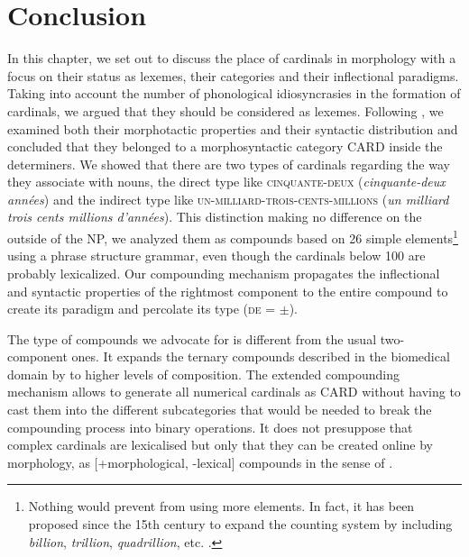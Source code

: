 \documentclass[output=paper]{langsci/langscibook}
\begin{document}


\section{Conclusion}\label{Sec4}
In this chapter, we set out to discuss the place of cardinals  in  morphology with a focus on their status as lexemes, their categories and their inflectional  paradigms. Taking into account the number of phonological idiosyncrasies in the formation of  cardinals, we argued that they should be considered as lexemes. Following \cite{Saulnier08, Saulnier10, FradinSaulnier09}, we examined both their morphotactic properties and their syntactic distribution and concluded that they belonged to a morphosyntactic category CARD inside the determiners. We showed that there are two types of cardinals  regarding the way they associate with nouns, the direct type like \textsc{cinquante-deux} (\emph{cinquante-deux années}) and the indirect type like \textsc{un-milliard-trois-cents-millions} (\emph{un milliard trois cents millions d'années}).  This distinction making no difference on the outside of the NP, we analyzed them as compounds  based on 26 simple elements\footnote{Nothing would prevent  from using more elements. In fact, it has been proposed since the 15th century to expand the counting system by including \emph{billion}, \emph{trillion}, \emph{quadrillion}, etc. \citep[see][147--151 for an overview of the proposals]{Saulnier10}.} using a phrase structure grammar, even though the cardinals  below 100 are probably lexicalized. Our compounding  mechanism propagates the inflectional  and syntactic properties of the rightmost component to the entire compound  to create its paradigm  and percolate its type (\textsc{de} = $\pm$).

The type of compounds  we advocate for is different from the usual two-compo\-nent ones. It expands the ternary compounds  described in the biomedical domain by \cite{Namer05} to higher levels of composition. The extended compounding  mechanism allows to generate all numerical cardinals  as CARD without having to cast them into the different subcategories that would be needed to break the compounding  process into binary operations. It does not presuppose that complex cardinals  are lexicalised but only that they can be created online by morphology, as [+morphological, -lexical] compounds  in the sense of \cite{GaetaRicca09}.
\end{document}
